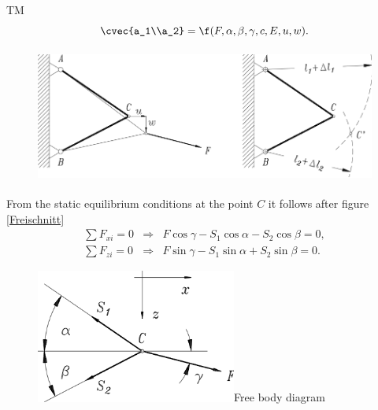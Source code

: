 \begin{example}{TM}
\begin{equation}
\cvec{a_1\\a_2} = \f( F, \alpha, \beta, \gamma, c, E, u, w).
\end{equation} 

\newpage
\begin {figure} [htbp]
\begin {center}
\includegraphics[height=4.4cm]{BELASTG.png}
\caption {}
\end {center}
\end {figure}

  From the static equilibrium conditions at the point $C$ it follows after figure \ref{Freischnitt}
\begin{eqnarray}
\sum F_{xi} = 0 & \Longrightarrow & 
  F \cos \gamma - S_1 \cos \alpha - S_2 \cos \beta = 0, \label{TMGS1}\\
\sum F_{zi} = 0 & \Longrightarrow & 
  F \sin \gamma - S_1 \sin \alpha + S_2 \sin \beta = 0.
\end{eqnarray}

\begin {figure} [htbp]
\begin {center}
\includegraphics[height=4.4cm]{KRAEFTE.png}{Free body diagram}
\caption {}%
\end {center}
\end {figure}


\end{example}
